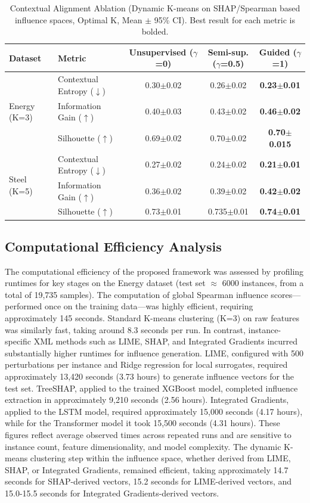 \documentclass[final,authoryear,3p,times,review,sort&compress]{elsarticle}
\begin{document}
\begin{table}[t!]
\centering
\caption{Contextual Alignment Ablation (Dynamic K-means on SHAP/Spearman based influence spaces, Optimal K, Mean $\pm$ 95\% CI). Best result for each metric is bolded.}
\label{tab:contextual_ablation_exp}
\begin{tabular}{@{}llccc@{}}
\toprule
\textbf{Dataset} & \textbf{Metric} & \textbf{Unsupervised ($\gamma$=0)} & \textbf{Semi-sup. ($\gamma$=0.5)} & \textbf{Guided ($\gamma$=1)} \\ \midrule
\multirow{3}{*}{Energy (K=3)} & Contextual Entropy ($\downarrow$) & 0.30$\pm$0.02 & 0.26$\pm$0.02 & \textbf{0.23$\pm$0.01} \\
 & Information Gain ($\uparrow$) & 0.40$\pm$0.03 & 0.43$\pm$0.02 & \textbf{0.46$\pm$0.02} \\
 & Silhouette ($\uparrow$) & 0.69$\pm$0.02 & 0.70$\pm$0.02 & \textbf{0.70$\pm$0.015} \\ \midrule
\multirow{3}{*}{Steel (K=5)} & Contextual Entropy ($\downarrow$) & 0.27$\pm$0.02 & 0.24$\pm$0.02 & \textbf{0.21$\pm$0.01} \\
 & Information Gain ($\uparrow$) & 0.36$\pm$0.02 & 0.39$\pm$0.02 & \textbf{0.42$\pm$0.02} \\
 & Silhouette ($\uparrow$) & 0.73$\pm$0.01 & 0.735$\pm$0.01 & \textbf{0.74$\pm$0.01} \\ \bottomrule
\end{tabular}
\end{table}

\subsection{Computational Efficiency Analysis}
\label{sec:computational_efficiency}
The computational efficiency of the proposed framework was assessed by profiling runtimes for key stages on the Energy dataset (test set $\approx$ 6000 instances, from a total of 19,735 samples). The computation of global Spearman influence scores—performed once on the training data—was highly efficient, requiring approximately 145 seconds. Standard K-means clustering (K=3) on raw features was similarly fast, taking around 8.3 seconds per run.
In contrast, instance-specific XML methods such as LIME, SHAP, and Integrated Gradients incurred substantially higher runtimes for influence generation. LIME, configured with 500 perturbations per instance and Ridge regression for local surrogates, required approximately 13,420 seconds (3.73 hours) to generate influence vectors for the test set. TreeSHAP, applied to the trained XGBoost model, completed influence extraction in approximately 9,210 seconds (2.56 hours). Integrated Gradients, applied to the LSTM model, required approximately 15,000 seconds (4.17 hours), while for the Transformer model it took 15,500 seconds (4.31 hours). These figures reflect average observed times across repeated runs and are sensitive to instance count, feature dimensionality, and model complexity.
The dynamic K-means clustering step within the influence space, whether derived from LIME, SHAP, or Integrated Gradients, remained efficient, taking approximately 14.7 seconds for SHAP-derived vectors, 15.2 seconds for LIME-derived vectors, and 15.0-15.5 seconds for Integrated Gradients-derived vectors.
\end{document}
